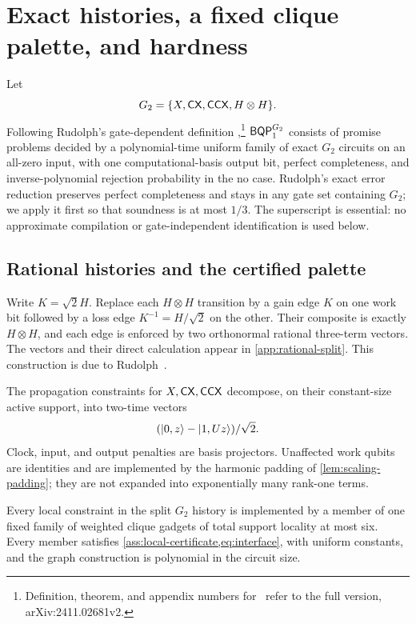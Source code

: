\section{Exact histories, a fixed clique palette, and hardness}
\label{sec:circuit}

Let
\[
G_2=\{X,\mathsf{CX},\mathsf{CCX},H\otimes H\}.
\]
Following Rudolph's gate-dependent definition
\cite[Definition~2.2]{rudolph2026universal},\footnote{Definition, theorem,
and appendix numbers for~\cite{rudolph2026universal} refer to the full
version, arXiv:2411.02681v2.} \(\mathsf{BQP}_{1}^{G_2}\) consists of
promise problems decided by a polynomial-time uniform family of exact
\(G_2\) circuits on an all-zero input, with one computational-basis output
bit, perfect completeness, and inverse-polynomial rejection probability in
the no case.  Rudolph's exact error reduction
\cite[Theorem~2.3]{rudolph2026universal} preserves perfect completeness and
stays in any gate set containing \(G_2\); we apply it first so that soundness
is at most \(1/3\).  The superscript is essential: no approximate compilation
or gate-independent identification is used below.

\subsection{Rational histories and the certified palette}

Write \(K=\sqrt2H\).  Replace each \(H\otimes H\) transition by a gain edge
\(K\) on one work bit followed by a loss edge \(K^{-1}=H/\sqrt2\) on the
other.  Their composite is exactly \(H\otimes H\), and each edge is enforced
by two orthonormal rational three-term vectors.  The vectors and their direct
calculation appear in \cref{app:rational-split}.  This construction is due to
Rudolph~\cite[Appendix~D.1]{rudolph2026universal}.

The propagation constraints for \(X,\mathsf{CX},\mathsf{CCX}\) decompose, on their
constant-size active support, into two-time vectors
\[
(\lvert 0,z\rangle-\lvert 1,Uz\rangle)/\sqrt2.
\]
Clock, input, and output penalties are basis projectors.  Unaffected work
qubits are identities and are implemented by the harmonic padding of
\cref{lem:scaling-padding}; they are not expanded into exponentially many
rank-one terms.

\begin{lemma}
\label{lem:palette}
Every local constraint in the split \(G_2\) history is implemented by a
member of one fixed family of weighted clique gadgets of total support
locality at most six.  Every member satisfies
\cref{ass:local-certificate,eq:interface}, with uniform constants, and the
graph construction is polynomial in the circuit size.
\end{lemma}

